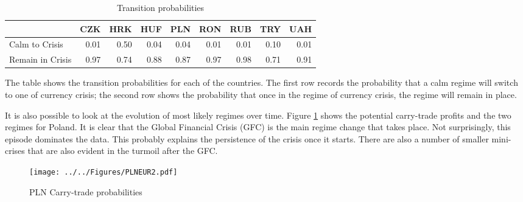 \documentclass[12pt, a4paper, oneside]{article}\usepackage[]{graphicx}\usepackage[]{color}
\begin{document}
\begin{table}[t]
\begin{threeparttable}
\centering
\begin{tabular}{p{3cm}rrrrrrrr}
  \hline
& CZK & HRK & HUF & PLN & RON & RUB & TRY & UAH\\ 
  \hline
Calm to Crisis & 0.01 & 0.50 & 0.04 & 0.04 & 0.01 & 0.01 & 0.10 & 0.01\\
Remain in Crisis & 0.97 & 0.74 & 0.88 & 0.87 & 0.97 & 0.98 & 0.71 & 0.91 \\
  \hline
\end{tabular}
\begin{tablenotes}
\small
\item  The table shows the transition probabilities for each of the countries.  The first row records the probability that a calm regime will switch to one of currency crisis; the second row shows the probability that once in the regime of currency crisis, the regime will remain in place. 
\end{tablenotes}
\caption{Transition probabilities}
\label{tabref:transprob}
\end{threeparttable}
\end{table}

It is also possible to look at the evolution of most likely regimes over time.  Figure \ref{figref:pln} shows the potential carry-trade profits and the two regimes for Poland.  It is clear that the Global Financial Crisis (GFC) is the main regime change that takes place.  Not surprisingly, this episode dominates the data.  This probably explains the persistence of the crisis once it starts. There are also a number of smaller mini-crises that are also evident in the turmoil after the GFC. 

\begin{figure}[ht]
\centering
\texttt{[image: ../../Figures/PLNEUR2.pdf]}
\caption{PLN Carry-trade probabilities}
\label{figref:pln}
\end{figure}
\end{document}
